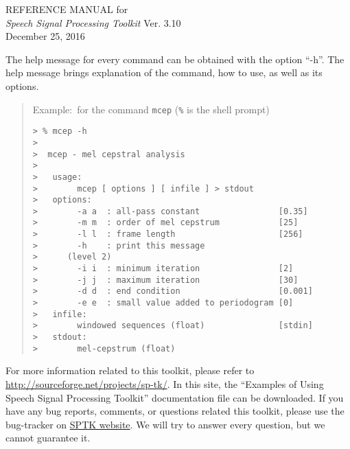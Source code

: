 \documentclass[12pt]{book}
\begin{document}


\begin{titlepage} 
\vspace*{\fill}
 \begin{center}
        \LARGE
        {\rm REFERENCE MANUAL for} \\
        {\sl Speech Signal Processing Toolkit} Ver. 3.10 \\[10mm]
        {\rm December 25, 2016}
 \end{center}
\vspace*{\fill}
\vspace*{\fill}

\newpage
\thispagestyle{empty}
\vspace*{\fill}
\noindent
The help message for every command can be obtained
with the option ``-h''.
The help message brings explanation of the command, how to use, 
as well as its options.

\begin{quote}
 Example:~for the command \verb!mcep! (\verb!%! is the shell prompt)
 \begin{verbatim}
> % mcep -h
> 
>  mcep - mel cepstral analysis
> 
>   usage:
>        mcep [ options ] [ infile ] > stdout
>   options:
>        -a a  : all-pass constant                [0.35]
>        -m m  : order of mel cepstrum            [25]
>        -l l  : frame length                     [256]
>        -h    : print this message
>      (level 2)
>        -i i  : minimum iteration                [2]
>        -j j  : maximum iteration                [30]
>        -d d  : end condition                    [0.001]
>        -e e  : small value added to periodogram [0]
>   infile:
>        windowed sequences (float)               [stdin]
>   stdout:
>        mel-cepstrum (float)
 \end{verbatim}
\end{quote}
\vspace{\baselineskip}
\noindent
For more information related to this toolkit,
please refer to
\href{http://sourceforge.net/projects/sp-tk/}{http://sourceforge.net/projects/sp-tk/}.
In this site, the
``Examples of Using Speech Signal Processing Toolkit''
documentation file can be downloaded.
If you have any bug reports, comments, or questions
related this toolkit, please use the bug-tracker on
\href{http://sourceforge.net/tracker/?group_id=176586}{SPTK website}.
We will try to answer every question, but we cannot guarantee it.
\end{titlepage}
\end{document}
